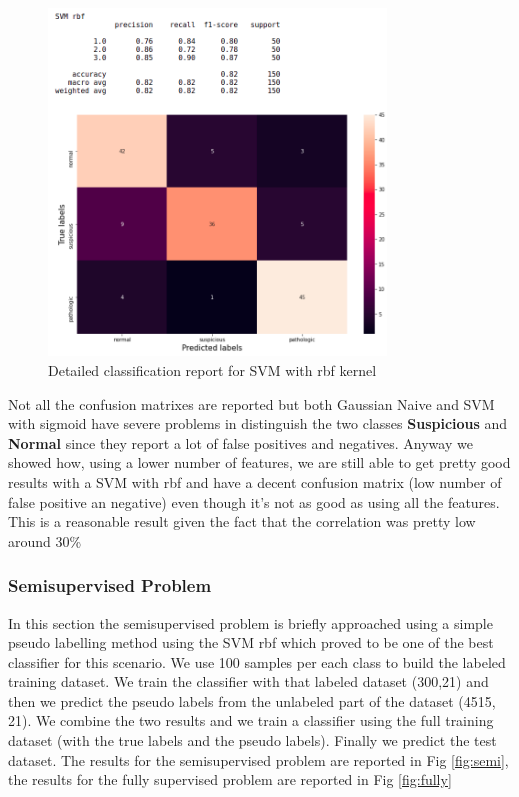 \documentclass[a4paper,12pt]{article}
\begin{document}
\begin{figure}[H]
  \begin{center}
  \includegraphics[width=0.8\textwidth]{images/svm_rbf_corr.png}
  \end{center}
  \caption{Detailed classification report for SVM with rbf kernel}
  \label{fig:poly}
\end{figure}

\noindent Not all the confusion matrixes are reported but both Gaussian Naive and SVM with sigmoid have severe problems in distinguish the two classes \textbf{Suspicious} and \textbf{Normal} since they report a lot of false positives and negatives. Anyway we showed how, using a lower number of features, we are still able to get pretty good results with a SVM with rbf and have a decent confusion matrix (low number of false positive an negative) even though it's not as good as using all the features. This is a reasonable result given the fact that the correlation was pretty low around 30\%

\subsubsection{Semisupervised Problem}
In this section the semisupervised problem is briefly approached using a simple pseudo labelling method using the SVM rbf which proved to be one of the best classifier for this scenario. We use 100 samples per each class to build the labeled training dataset. We train the classifier with that labeled dataset (300,21) and then we predict the pseudo labels from the unlabeled part of the dataset (4515, 21). We combine the two results and we train a classifier using the full training dataset (with the true labels and the pseudo labels). Finally we predict the test dataset. The results for the semisupervised problem are reported in Fig \ref{fig:semi}, the results for the fully supervised problem are reported in Fig \ref{fig:fully}  
\end{document}
